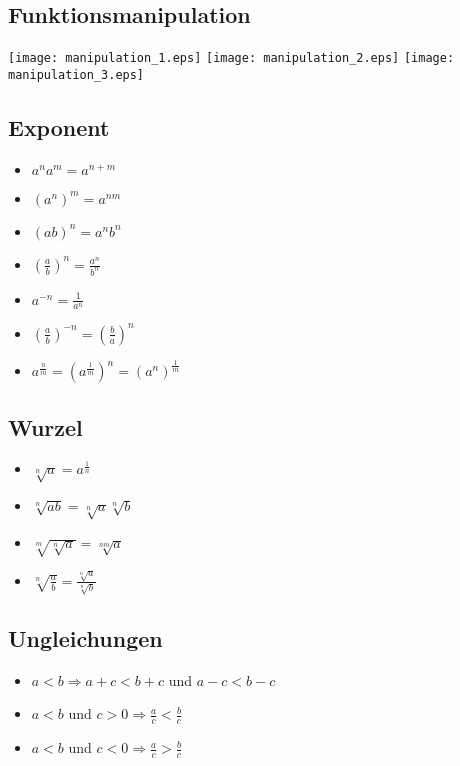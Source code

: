 \subsection{Funktionsmanipulation}
\texttt{[image: manipulation\_1.eps]}
\texttt{[image: manipulation\_2.eps]}
\texttt{[image: manipulation\_3.eps]}

\begin{multicols}{2}

\subsection{Exponent}
\begin{itemize}[leftmargin=*]
  \item $a^n a^m = a^{n + m}$
  \item $(a^n)^m = a^{nm}$
  \item $(ab)^n = a^n b^n$
  \item $\left( \frac{a}{b} \right)^n = \frac{a^n}{b^n}$
  \item $a^{-n} = \frac{1}{a^n}$
  \item $\left( \frac{a}{b} \right)^{-n} = \left( \frac{b}{a} \right)^n$
  \item $a^\frac{n}{m} = (a^\frac{1}{m})^n = (a^n)^\frac{1}{m}$
\end{itemize}
\columnbreak

\subsection{Wurzel}
\begin{itemize}[leftmargin=*]
  \item $\sqrt[n]{a} = a^\frac{1}{n}$
  \item $\sqrt[n]{ab} = \sqrt[n]{a} \sqrt[n]{b}$
  \item $\sqrt[m]{\sqrt[n]{a}} = \sqrt[nm]{a}$
  \item $\sqrt[n]{\frac{a}{b}} = \frac{\sqrt[n]{a}}{\sqrt[n]{b}}$
\end{itemize}

\end{multicols}

\subsection{Ungleichungen}
\begin{itemize}[leftmargin=*]
  \item $a < b \Rightarrow a + c < b + c$ und $a - c < b - c$
  \item $a < b$ und $c > 0 \Rightarrow \frac{a}{c} < \frac{b}{c}$
  \item $a < b$ und $c < 0 \Rightarrow \frac{a}{c} > \frac{b}{c}$ 
\end{itemize}

